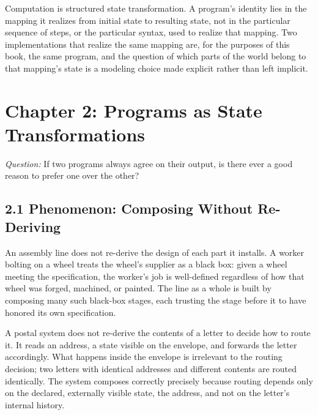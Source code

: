 \documentclass[11pt]{book}
\begin{document}
\begin{invariantbox}
Computation is structured state transformation. A program's identity lies in the mapping it realizes from initial state to resulting state, not in the particular sequence of steps, or the particular syntax, used to realize that mapping. Two implementations that realize the same mapping are, for the purposes of this book, the same program, and the question of which parts of the world belong to that mapping's state is a modeling choice made explicit rather than left implicit.
\end{invariantbox}

\clearpage

\chapter*{Chapter 2: Programs as State Transformations}

\begin{firstprinciples}
\textit{Question:} If two programs always agree on their output, is there ever a good reason to prefer one over the other?
\end{firstprinciples}

\section*{2.1 Phenomenon: Composing Without Re-Deriving}

An assembly line does not re-derive the design of each part it installs. A worker bolting on a wheel treats the wheel's supplier as a black box: given a wheel meeting the specification, the worker's job is well-defined regardless of how that wheel was forged, machined, or painted. The line as a whole is built by composing many such black-box stages, each trusting the stage before it to have honored its own specification.

A postal system does not re-derive the contents of a letter to decide how to route it. It reads an address, a state visible on the envelope, and forwards the letter accordingly. What happens inside the envelope is irrelevant to the routing decision; two letters with identical addresses and different contents are routed identically. The system composes correctly precisely because routing depends only on the declared, externally visible state, the address, and not on the letter's internal history.
\end{document}

